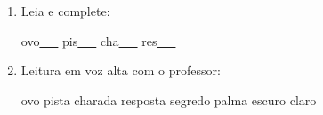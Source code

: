 \begin{exercicio}
\begin{enumerate}[resume]
\begin{enumerate}[label=(\alph*)]
    \item O som da unidade é: ( ) oral ( ) nasal 

    \item A primeira sílaba de OVO é: ( ) OVO ( ) PIS

    \item As palavras da unidade aparecem: ( ) no início ( ) no meio ( ) no fim das palavras

  \end{enumerate}

  \item Leia e complete:
  \begin{center}
  ovo\underline{~~~} \quad pis\underline{~~~} \quad cha\underline{~~~} \quad res\underline{~~~}
  \end{center}

  \item Leitura em voz alta com o professor:
  \begin{center}
  ovo \quad pista \quad charada \quad resposta \quad segredo \quad palma \quad escuro \quad claro
  \end{center}

\end{enumerate}

\end{exercicio}



